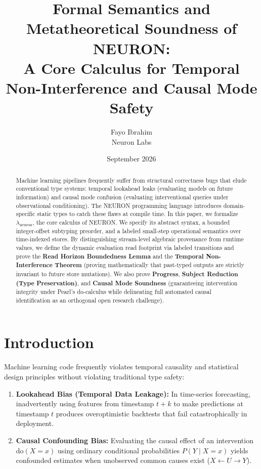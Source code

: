 \documentclass[11pt,a4paper]{article}
\title{\textbf{Formal Semantics and Metatheoretical Soundness of NEURON:}\\A Core Calculus for Temporal Non-Interference and Causal Mode Safety}
\author{Fayo Ibrahim \\ \small{Neuron Labs}}
\date{September 2026}
\theoremstyle{definition}
\theoremstyle{plain}
\begin{document}
\maketitle

\begin{abstract}
Machine learning pipelines frequently suffer from structural correctness bugs that elude conventional type systems: temporal lookahead leaks (evaluating models on future information) and causal mode confusion (evaluating interventional queries under observational conditioning). The NEURON programming language introduces domain-specific static types to catch these flaws at compile time. In this paper, we formalize $\lambda_{\text{neuron}}$, the core calculus of NEURON. We specify its abstract syntax, a bounded integer-offset subtyping preorder, and a labeled small-step operational semantics over time-indexed stores. By distinguishing stream-level algebraic provenance from runtime values, we define the dynamic evaluation read footprint via labeled transitions and prove the \textbf{Read Horizon Boundedness Lemma} and the \textbf{Temporal Non-Interference Theorem} (proving mathematically that past-typed outputs are strictly invariant to future store mutations). We also prove \textbf{Progress}, \textbf{Subject Reduction (Type Preservation)}, and \textbf{Causal Mode Soundness} (guaranteeing intervention integrity under Pearl's do-calculus while delineating full automated causal identification as an orthogonal open research challenge).
\end{abstract}

\section{Introduction}

Machine learning code frequently violates temporal causality and statistical design principles without violating traditional type safety:
\begin{enumerate}[itemsep=1pt]
  \item \textbf{Lookahead Bias (Temporal Data Leakage):} In time-series forecasting, inadvertently using features from timestamp $t+k$ to make predictions at timestamp $t$ produces overoptimistic backtests that fail catastrophically in deployment.
  \item \textbf{Causal Confounding Bias:} Evaluating the causal effect of an intervention $\text{do}(X=x)$ using ordinary conditional probabilities $P(Y \mid X=x)$ yields confounded estimates when unobserved common causes exist ($X \leftarrow U \rightarrow Y$).
\end{enumerate}
\end{document}
